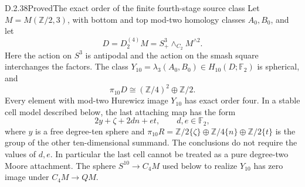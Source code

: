 \begin{claim}{D.2.38}{Proved}{The exact order of the finite fourth-stage source class}
Let $M=M(\mathbb Z/2,3)$, with bottom and top mod-two homology
classes $A_0,B_0$, and let
\[
 D=D_2^{(4)}M=S^3_+\wedge_{C_2}M^{\wedge2}.
 \tag{D.2.38a}
\]
Here the action on $S^3$ is antipodal and the action on the smash
square interchanges the factors.  The class
$Y_{10}=\lambda_3(A_0,B_0)\in H_{10}(D;\mathbb F_2)$
is spherical, and
\[
 \pi_{10}D\cong(\mathbb Z/4)^2\oplus\mathbb Z/2.
 \tag{D.2.38b}
\]
Every element with mod-two Hurewicz image $Y_{10}$ has exact
order four.  In a stable cell model described below, the last
attaching map has the form
\[
 2y+\zeta+2d n+e t,\qquad d,e\in\mathbb F_2,
 \tag{D.2.38c}
\]
where $y$ is a free degree-ten sphere and
$\pi_{10}R=\mathbb Z/2\{\zeta\}\oplus
\mathbb Z/4\{n\}\oplus\mathbb Z/2\{t\}$ is the group of
the other ten-dimensional summand.  The conclusions do not
require the values of $d,e$.  In particular the last cell cannot
be treated as a pure degree-two Moore attachment.
The sphere $S^{10}\to C_4M$ used below to realize $Y_{10}$
has zero image under $C_4M\to QM$.
\end{claim}
